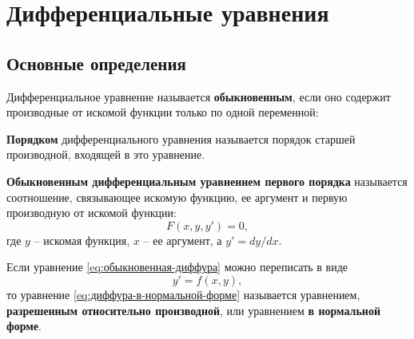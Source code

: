 \documentclass[a5paper, 11pt]{extbook}
\theoremstyle{definition}
\theoremstyle{definition}
\newtheorem{definition}{Определение}[chapter]
\begin{document}






\chapter{Дифференциальные уравнения}

\section{Основные определения}

Дифференциальное уравнение называется \textbf{обыкновенным}, если оно содержит производные от искомой функции только по одной переменной:

\textbf{Порядком} дифференциального уравнения называется порядок старшей производной, входящей в это уравнение.

\textbf{Обыкновенным дифференциальным уравнением первого порядка} называется соотношение, связывающее искомую функцию, ее аргумент и первую производную от искомой функции:
\begin{equation}
    \label{eq:обыкновенная-диффура}
    F(x, y, y') = 0,
\end{equation}
где \(y\) -- искомая функция, \(x\) -- ее аргумент, а \(y' = dy / dx\).

\label{def:диффура-в-нормальной-форме}
Если уравнение \eqref{eq:обыкновенная-диффура} можно переписать в виде
\begin{equation}
    \label{eq:диффура-в-нормальной-форме}
    y' = f(x, y),
\end{equation}
то уравнение \eqref{eq:диффура-в-нормальной-форме} называется уравнением, \textbf{разрешенным относительно производной}, или уравнением \textbf{в нормальной форме}.
\end{document}
